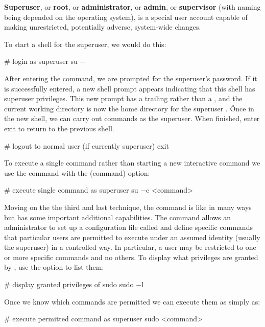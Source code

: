 \textbf{Superuser}, or \textbf{root}, or \textbf{administrator}, or \textbf{admin}, or \textbf{supervisor} (with naming
being depended on the operating system), is a special user account capable of making unrestricted, potentially adverse,
system-wide changes.
\ed

To start a shell for the superuser, we would do this:
\begin{bash}
# login as superuser
su $-$
\end{bash}

After entering the command, we are prompted for the superuser's password. If it is successfully entered, a new shell
prompt appears indicating that this shell has superuser privileges. This new prompt has a trailing \code{$\#$} rather than
a \code{$\$$}, and the current working directory is now the home directory for the superuser . \v

Once in the new shell, we can carry out commands as the superuser. When finished, enter exit to return to the previous
shell.
\begin{bash}
# logout to normal user (if currently superuser)
exit
\end{bash}

To execute a single command rather than starting a new interactive command we use the  command with the
 (command) option:
\begin{bash}
# execute single command as superuser
su $-$c <command>
\end{bash}

Moving on the the third and last technique, the  command is like  in many ways but has some
important additional capabilities. The  command allows an administrator to set up a configuration file
called  and define specific commands that particular users are permitted to execute under an
assumed identity (usually the superuser) in a controlled way. In particular, a user may be restricted to one or more
specific commands and no others. To display what privileges are granted by , use the  option to
list them:
\begin{bash}
# display granted privileges of sudo
sudo $-$l
\end{bash}

Once we know which commands are permitted we can execute them as simply as:
\begin{bash}
# execute permitted command as superuser
sudo <command>
\end{bash}

